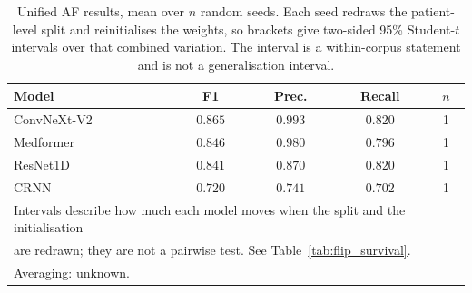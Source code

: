 \begin{table}[ht]
\centering
\caption{Unified AF results, mean over $n$ random seeds. Each seed redraws the patient-level split and reinitialises the weights, so brackets give two-sided 95\% Student-$t$ intervals over that combined variation. The interval is a within-corpus statement and is not a generalisation interval.}
\label{tab:seed_unified_af}
\small
\begin{tabular}{lcccc}
\toprule
Model & F1 & Prec. & Recall & $n$ \\
\midrule
ConvNeXt-V2 & $0.865$ & $0.993$ & $0.820$ & 1 \\
Medformer & $0.846$ & $0.980$ & $0.796$ & 1 \\
ResNet1D & $0.841$ & $0.870$ & $0.820$ & 1 \\
CRNN & $0.720$ & $0.741$ & $0.702$ & 1 \\
\midrule
\multicolumn{5}{l}{\footnotesize Intervals describe how much each model moves when the split and the initialisation} \\
\multicolumn{5}{l}{\footnotesize are redrawn; they are not a pairwise test. See Table~\ref{tab:flip_survival}.} \\
\multicolumn{5}{l}{\footnotesize Averaging: unknown.} \\
\bottomrule
\end{tabular}
\end{table}

